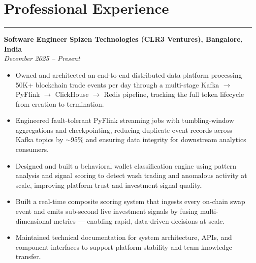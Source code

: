 \documentclass[12pt]{article}
\begin{document}
\section*{Professional Experience}
\vspace{1pt}\hrule\vspace{4pt}

\textbf{Software Engineer} \hfill \textbf{Spizen Technologies (CLR3 Ventures), Bangalore, India} \\
\textit{December 2025 -- Present}
\begin{itemize}
  \item Owned and architected an end-to-end distributed data platform processing 50K+ blockchain trade events per day through a multi-stage Kafka $\rightarrow$ PyFlink $\rightarrow$ ClickHouse $\rightarrow$ Redis pipeline, tracking the full token lifecycle from creation to termination.
  \item Engineered fault-tolerant PyFlink streaming jobs with tumbling-window aggregations and checkpointing, reducing duplicate event records across Kafka topics by $\sim$95\% and ensuring data integrity for downstream analytics consumers.
  \item Designed and built a behavioral wallet classification engine using pattern analysis and signal scoring to detect wash trading and anomalous activity at scale, improving platform trust and investment signal quality.
  \item Built a real-time composite scoring system that ingests every on-chain swap event and emits sub-second live investment signals by fusing multi-dimensional metrics --- enabling rapid, data-driven decisions at scale.
  \item Maintained technical documentation for system architecture, APIs, and component interfaces to support platform stability and team knowledge transfer.
\end{itemize}
\end{document}
